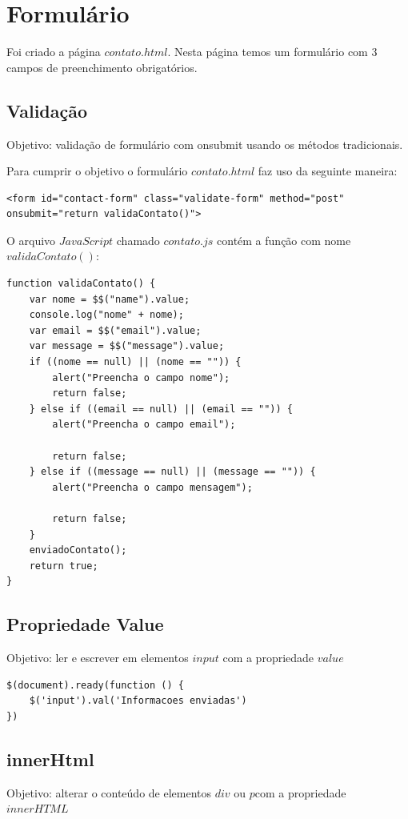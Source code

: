  


\section{Formulário}
	Foi criado a página $contato.html$. Nesta página temos um formulário com $3$ campos de preenchimento obrigatórios.
	
\subsection{Validação}
	Objetivo: validação de formulário com onsubmit usando os métodos tradicionais.
	
	Para cumprir o objetivo o formulário $contato.html$ faz uso da seguinte maneira:
\begin{lstlisting}
<form id="contact-form" class="validate-form" method="post" onsubmit="return validaContato()">
\end{lstlisting}

	O arquivo $JavaScript$ chamado $contato.js$ contém a função com nome $validaContato()$:
\begin{lstlisting}
function validaContato() {
    var nome = $$("name").value;
    console.log("nome" + nome);
    var email = $$("email").value;
    var message = $$("message").value;
    if ((nome == null) || (nome == "")) {
        alert("Preencha o campo nome");
        return false;
    } else if ((email == null) || (email == "")) {
        alert("Preencha o campo email");

        return false;
    } else if ((message == null) || (message == "")) {
        alert("Preencha o campo mensagem");

        return false;
    }
    enviadoContato();
    return true;
}
\end{lstlisting}
	

\subsection{Propriedade Value}
	Objetivo: ler e escrever em elementos $input$ com a propriedade $value$
	
\begin{lstlisting}
$(document).ready(function () {
    $('input').val('Informacoes enviadas')
})
\end{lstlisting}


\subsection{innerHtml}
	Objetivo: alterar o conteúdo de elementos $div$ ou $p$com a propriedade $innerHTML$
	
